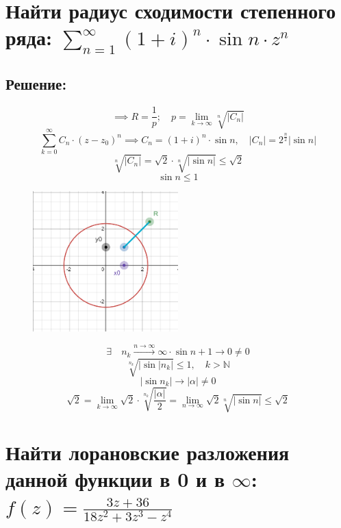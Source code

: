 \documentclass{article}
\begin{document}
        \section{Найти радиус сходимости степенного ряда: $\sum\limits_{n=1}^{\infty}(1 + i)^n \cdot \sin{n} \cdot z^n$}
	\subsection{Решение:}
        $$\implies R = \frac{1}{p}; \quad p = \lim_{{k \to \infty}}  \sqrt[n]{|C_n|}
        $$
        $$\sum\limits_{k=0}^{\infty}C_n \cdot (z-z_0)^n \implies C_n = (1 + i)^n \cdot \sin{n}, \quad |C_n| = 2^{\frac{n}{2}} |\sin{n}|$$
        $$\sqrt[n]{|C_n|} = \sqrt{2} \cdot \sqrt[n]{|\sin{n}|} \le \sqrt{2}$$
        $$\sin{n} \le 1$$

         \begin{figure}[h]
            \centering
            \includegraphics[width=0.5\textwidth]{rg_4.png}
            \label{fig:my_label}
        \end{figure}
        
        $$\exists \quad n_k  \xrightarrow{n \rightarrow \infty} \infty \cdot \sin{n + 1} \rightarrow 0 \neq 0$$
        $$\sqrt[n_k]{|\sin{|n_k|}} \le 1, \quad k > \mathbb{N}$$
        $$|\sin{n_k}|  \rightarrow |\alpha| \neq 0  $$
        $$\sqrt{2} = \lim_{{k \to \infty}} \sqrt{2} \cdot \sqrt[n_k]{\frac{|\alpha|}{2}} = \lim_{{n \to \infty}} \sqrt{2} \sqrt[n]{|\sin{n}|} \le \sqrt{2}$$
        
        \section{Найти лорановские разложения данной функции в 0 и в $\infty$: $f(z) = \frac{3z+36}{18z^2 + 3z^3 -  z^4}$}
\end{document}
